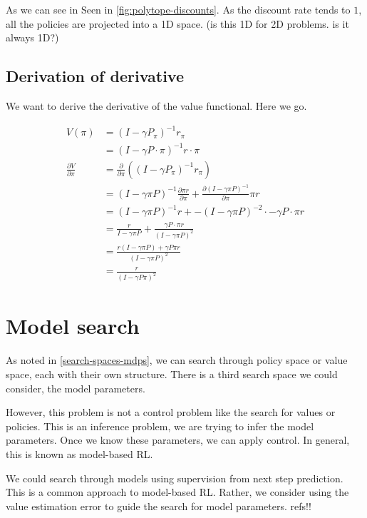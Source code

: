 As we can see in Seen in \ref{fig:polytope-discounts}. As the discount rate tends to $1$,
all the policies are projected into a 1D space. (is this 1D for 2D problems. is it always 1D?)

\subsection{Derivation of derivative}

We want to derive the derivative of the value functional. Here we go.

\begin{align*}
V(\pi) &= (I − \gamma P_{\pi})^{−1}r_{\pi} \tag{value functional}\\
&= (I − \gamma P\cdot \pi)^{−1}r\cdot \pi \\
\frac{\partial V}{\partial \pi} &= \frac{\partial}{\partial \pi}((I-\gamma P_{\pi})^{-1} r_{\pi}) \\
&= (I-\gamma \pi P)^{-1} \frac{\partial \pi r}{\partial \pi}+   \frac{\partial (I-\gamma \pi P)^{-1}}{\partial \pi}\pi r\tag{product rule} \\
&= (I-\gamma \pi P)^{-1} r + -(I-\gamma \pi P)^{-2} \cdot -\gamma P\cdot \pi r\\
&= \frac{r}{I-\gamma \pi P} + \frac{ \gamma P\cdot \pi r}{(I-\gamma \pi P)^2} \tag{rewrite as fractions}\\
&= \frac{r(I-\gamma \pi P) + \gamma P \pi r}{(I-\gamma \pi P)^2} \tag{common demoninator}\\
& = \frac{r}{(I-\gamma P \pi)^2} \tag{cancel}
\end{align*}

\newpage
\section{Model search} \label{model-iteration}

As noted in \ref{search-spaces-mdps}, we can search through policy space or value
space, each with their own structure.
There is a third search space we could consider, the model parameters.

However, this problem is not a control problem like the search for values or policies.
This is an inference problem, we are trying to infer the model parameters.
Once we know these parameters, we can apply control.
In general, this is known as model-based RL.

We could search through models using supervision from next step prediction.
This is a common approach to model-based RL. Rather, we consider using the value estimation error
to guide the search for model parameters. {\color{red}refs!!}


